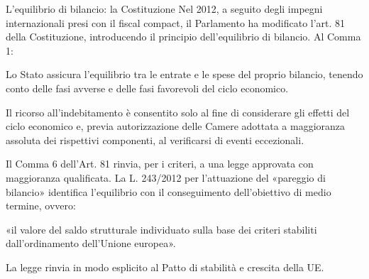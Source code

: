 \documentclass[aspectratio=149,11pt,italian]{beamer}
\begin{document}
\begin{frame}{L'equilibrio di bilancio: la Costituzione}
Nel 2012, a seguito degli impegni internazionali presi con il \alert{fiscal compact}, il Parlamento ha modificato l'art. 81 della Costituzione, introducendo il principio dell'\alert{equilibrio di bilancio}. Al Comma 1:

\begin{quoting}
\footnotesize
Lo Stato assicura l’equilibrio tra le entrate e le spese del proprio
bilancio, tenendo conto delle fasi avverse e delle fasi favorevoli del ciclo
economico.

Il ricorso all’indebitamento è consentito solo al fine di considerare gli
effetti del ciclo economico e, previa autorizzazione delle Camere adottata a
maggioranza assoluta dei rispettivi componenti, al verificarsi di eventi
eccezionali.
\end{quoting}

Il Comma 6 dell'Art. 81 rinvia, per i criteri, a una legge approvata con
maggioranza qualificata. La L. 243/2012 per l'attuazione del «pareggio di
bilancio» identifica l'equilibrio con il conseguimento dell'\alert{obiettivo di
medio termine}, ovvero:

\begin{quoting}
\small
«il valore del \alert{saldo strutturale} individuato sulla base dei criteri
stabiliti dall'ordinamento dell'Unione europea».
\end{quoting}

La legge rinvia in modo esplicito al \alert{Patto di stabilità e crescita} della UE.
\end{frame}
\end{document}
